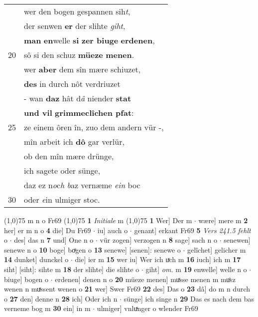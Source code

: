 \documentclass[8pt,a4paper,notitlepage]{article}
\begin{document}
\begin{table}[ht]
\begin{minipage}[t]{0.5\linewidth}
\begin{tabular}{rl}
 & wer den bogen gespannen sih\textit{t},\\ 
 & der senwen \textbf{er} der slihte \textit{giht},\\ 
 & \textbf{man} \textbf{en}welle \textbf{si} \textbf{zer biuge} \textbf{erdenen},\\ 
20 & sô si den schuz \textbf{müeze} \textbf{menen}.\\ 
 & wer \textbf{aber} dem sîn mære schiuzet,\\ 
 & \textbf{des} in durch nôt verdriuzet\\ 
 & - wan \textbf{daz} hât d\textit{â} niender \textbf{stat}\\ 
 & \textbf{und vil} \textbf{grimmeclîchen pfat}:\\ 
25 & ze einem ôren în, zuo dem andern vür -,\\ 
 & mîn arbeit ich \textbf{dô} gar verlür,\\ 
 & ob den mîn mære drünge,\\ 
 & ich sagete oder sünge,\\ 
 & daz ez n\textit{o}c\textit{h} \textit{b}az vernæme \textit{ein} boc\\ 
30 & oder \textit{e}in ulmiger stoc.\\ 
\end{tabular}
\scriptsize
\line(1,0){75} \newline
m n o Fr69 \newline
\line(1,0){75} \newline
\textbf{1} \textit{Initiale} m  \newline
\line(1,0){75} \newline
\textbf{1} Wer] Der m  $\cdot$ wære] mere m \textbf{2} her] er m n o \textbf{4} die] Du Fr69  $\cdot$ iu] auch o  $\cdot$ genant] erkant Fr69 \textbf{5} \textit{Vers 241.5 fehlt} o   $\cdot$ des] das n \textbf{7} und] One n o  $\cdot$ vür zogen] verzogen n \textbf{8} sage] sach n o  $\cdot$ senewen] senewe n o \textbf{10} boge] boͯgen o \textbf{13} senewe] [senen]: senewe o  $\cdot$ gelîchet] gelicher m \textbf{14} dunket] dunckel o  $\cdot$ die] ier m \textbf{15} wer iu] Wer ich uͯch m \textbf{16} iuch] ich m \textbf{17} siht] [siht]: sihte m \textbf{18} der slihte] die slihte o  $\cdot$ giht] \textit{om.} m \textbf{19} enwelle] welle n o  $\cdot$ biuge] bogen o  $\cdot$ erdenen] denen n o \textbf{20} müeze menen] muͯsse menen m muͦsz wenen n muͯssent wenen o \textbf{21} wer] Swer Fr69 \textbf{22} des] Das o \textbf{23} dâ] do m n durch o \textbf{27} den] denne n \textbf{28} ich] Oder ich n  $\cdot$ sünge] ich singe n \textbf{29} Das es nach dem bas verneme bog m \textbf{30} ein] in m  $\cdot$ ulmiger] vnluͯnger o wlender Fr69 \newline
\end{minipage}
\end{table}
\end{document}

